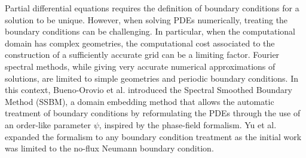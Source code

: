 Partial differential equations requires the definition of boundary conditions for a solution to be unique. However, when solving PDEs numerically, treating the boundary conditions can be challenging. In particular, when the computational domain has complex geometries, the computational cost associated to the construction of a sufficiently accurate grid can be a limiting factor. Fourier spectral methods, while giving very accurate numerical approximations of solutions, are limited to simple geometries and periodic boundary conditions. In this context, Bueno-Orovio et al. \cite{BuenoOrovioPerezGarcia2006,BuenoOrovioPerezGarciaFenton2006,BuenoOrovio2006-1} introduced the Spectral Smoothed Boundary Method (SSBM), a domain embedding method that allows the automatic treatment of boundary conditions by reformulating the PDEs through the use of an order-like parameter $\psi$, inspired by the phase-field formalism. Yu et al. \cite{YuChenThornton2009,YuChenThornton2012} expanded the formalism to any boundary condition treatment as the initial work was limited to the no-flux Neumann boundary condition.
